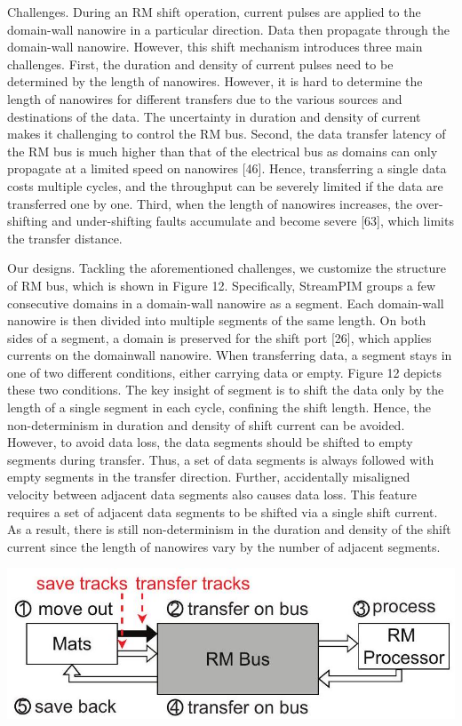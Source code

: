 \documentclass[10pt]{article}
\begin{document}
Challenges. During an RM shift operation, current pulses are applied to the domain-wall nanowire in a particular direction. Data then propagate through the domain-wall nanowire. However, this shift mechanism introduces three main challenges. First, the duration and density of current pulses need to be determined by the length of nanowires. However, it is hard to determine the length of nanowires for different transfers due to the various sources and destinations of the data. The uncertainty in duration and density of current makes it challenging to control the RM bus. Second, the data transfer latency of the RM bus is much higher than that of the electrical bus as domains can only propagate at a limited speed on nanowires [46]. Hence, transferring a single data costs multiple cycles, and the throughput can be severely limited if the data are transferred one by one. Third, when the length of nanowires increases, the over-shifting and under-shifting faults accumulate and become severe [63], which limits the transfer distance.

Our designs. Tackling the aforementioned challenges, we customize the structure of RM bus, which is shown in Figure 12. Specifically, StreamPIM groups a few consecutive domains in a domain-wall nanowire as a segment. Each domain-wall nanowire is then divided into multiple segments of the same length. On both sides of a segment, a domain is preserved for the shift port [26], which applies currents on the domainwall nanowire. When transferring data, a segment stays in one of two different conditions, either carrying data or empty. Figure 12 depicts these two conditions. The key insight of segment is to shift the data only by the length of a single segment in each cycle, confining the shift length. Hence, the non-determinism in duration and density of shift current can be avoided. However, to avoid data loss, the data segments should be shifted to empty segments during transfer. Thus, a set of data segments is always followed with empty segments in the transfer direction. Further, accidentally misaligned velocity between adjacent data segments also causes data loss. This feature requires a set of adjacent data segments to be shifted via a single shift current. As a result, there is still non-determinism in the duration and density of the shift current since the length of nanowires vary by the number of adjacent segments.

\begin{center}
\includegraphics[max width=\textwidth]{2024_05_12_abeba8a85da5b5ec4c7bg-07}
\end{center}
\end{document}

